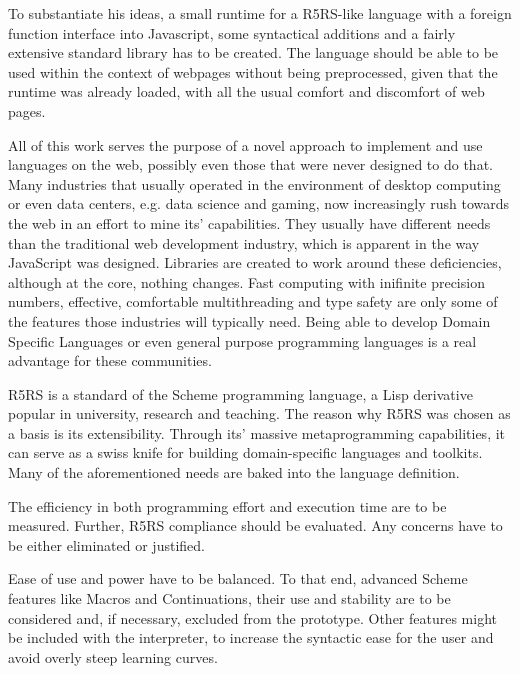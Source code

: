 \documentclass[oneside,11pt,xetex]{scrbook}
\begin{document}
To substantiate his ideas, a small runtime for a R5RS-like language with a foreign function interface into Javascript, some syntactical additions and a fairly extensive standard library has to be created. The language should be able to be used within the context of webpages without being preprocessed, given that the runtime was already loaded, with all the usual comfort and discomfort of web pages.
\vspace{0.3cm}

All of this work serves the purpose of a novel approach to implement and use languages on the web, possibly even those that were never designed to do that. Many industries that usually operated in the environment of desktop computing or even data centers, e.g. data science and gaming, now increasingly rush towards the web in an effort to mine its' capabilities. They usually have different needs than the traditional web development industry, which is apparent in the way JavaScript was designed. Libraries are created to work around these deficiencies, although at the core, nothing changes. Fast computing with inifinite precision numbers, effective, comfortable multithreading and type safety are only some of the features those industries will typically need. Being able to develop Domain Specific Languages or even general purpose programming languages is a real advantage for these communities.
\vspace{0.3cm}

R5RS is a standard of the Scheme programming language, a Lisp derivative popular in university, research and teaching. The reason why R5RS was chosen as a basis is its extensibility. Through its' massive metaprogramming capabilities, it can serve as a swiss knife for building domain-specific languages and toolkits. Many of the aforementioned needs are baked into the language definition.
\vspace{0.3cm}

The efficiency in both programming effort and execution time are to be measured. Further, R5RS compliance should be evaluated. Any concerns have to be either eliminated or justified.
\vspace{0.3cm}

Ease of use and power have to be balanced. To that end, advanced Scheme features like Macros and Continuations, their use and stability are to be considered and, if necessary, excluded from the prototype. Other features might be included with the interpreter, to increase the syntactic ease for the user and avoid overly steep learning curves.
\vspace{0.3cm}
\end{document}
